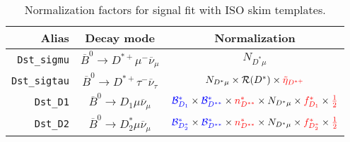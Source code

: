 \begin{landscape}
\begin{table}
\centering
\caption{
    Normalization factors for \Dstar signal fit with ISO skim templates.
}
\label{tab:fit-norm-fact-dst}
\scriptsize

\begin{tabular}{r|c|c}
\toprule
        \textbf{Alias} &                                \textbf{Decay mode}                                &                                                                                                                                                                                             \textbf{Normalization}                                                                                                                                                                                              \\
\midrule
   \texttt{Dst\_sigmu} &           $\overline{B}^0 \rightarrow D^{*+} \mu^- \overline{\nu}_\mu$            &                                                                                                                                                                                                  $N_{D^* \mu}$                                                                                                                                                                                                  \\
  \texttt{Dst\_sigtau} &          $\overline{B}^0 \rightarrow D^{*+} \tau^- \overline{\nu}_\tau$           &                                                                                                                                                               $N_{D^* \mu} \times \mathcal{R}(D^*) \times \textcolor{red}{\tilde{\eta}_{D^{*+}}}$                                                                                                                                                               \\
      \texttt{Dst\_D1} &              $\overline{B}^0 \rightarrow D_1 \mu \overline{\nu}_\mu$              &                                                                                           $\textcolor{blue}{\mathcal{B}^{*}_{D_1}} \times \textcolor{blue}{\mathcal{B}^*_{D^{**}}} \times \textcolor{red}{n^{*}_{D^{**}}} \times N_{D^* \mu} \times \textcolor{red}{f^{*}_{D_1}} \times \textcolor{red}{\frac{1}{2}}$                                                                                           \\
      \texttt{Dst\_D2} &             $\overline{B}^0 \rightarrow D^*_2 \mu \overline{\nu}_\mu$             &                                                                                         $\textcolor{blue}{\mathcal{B}^{*}_{D_2^*}} \times \textcolor{blue}{\mathcal{B}^*_{D^{**}}} \times \textcolor{red}{n^{*}_{D^{**}}} \times N_{D^* \mu} \times \textcolor{red}{f^{*}_{D_2^*}} \times \textcolor{red}{\frac{1}{2}}$                                                                                         \\

\end{tabular}
\end{table}
\end{landscape}

